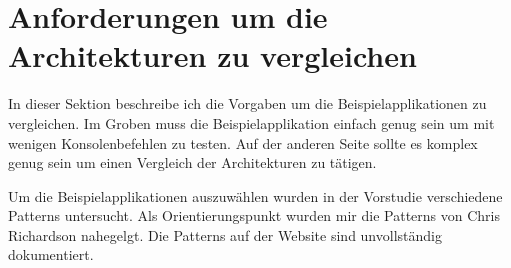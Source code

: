 \section{Anforderungen um die Architekturen zu vergleichen}

In dieser Sektion beschreibe ich die Vorgaben um die Beispielapplikationen zu vergleichen. Im Groben muss die Beispielapplikation einfach genug sein um mit wenigen Konsolenbefehlen zu testen. Auf der anderen Seite sollte es komplex genug sein um einen Vergleich der Architekturen zu tätigen.

Um die Beispielapplikationen auszuwählen wurden in der Vorstudie verschiedene Patterns untersucht. Als Orientierungspunkt wurden mir die Patterns von Chris Richardson \cite{microservicesio} nahegelgt. Die Patterns auf der Website sind unvollständig dokumentiert.